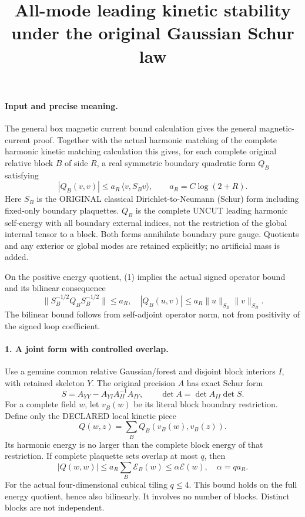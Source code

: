\documentclass[11pt]{article}
\title{All-mode leading kinetic stability under the original Gaussian Schur law}\author{}\date{}
\begin{document}
\maketitle
\paragraph{Input and precise meaning.}
The general box magnetic current bound calculation gives the general magnetic-current proof. Together
with the actual harmonic matching of the complete harmonic kinetic matching calculation this gives, for each complete
original relative block $B$ of side $R$, a real symmetric boundary
quadratic form $Q_B$ satisfying
\[
 |Q_B(v,v)|\le a_R\,\langle v,S_Bv\rangle,
 \qquad a_R=C\log(2+R).                                      \tag{1}
\]
Here $S_B$ is the ORIGINAL classical Dirichlet-to-Neumann (Schur)
form including fixed-only boundary plaquettes. $Q_B$ is the complete
UNCUT leading harmonic self-energy with all boundary external indices,
not the restriction of the global internal tensor to a block.
Both forms annihilate boundary pure gauge. Quotients and any exterior
or global modes are retained explicitly; no artificial mass is added.

On the positive energy quotient, (1) implies the actual signed operator
bound and its bilinear consequence
\[
 \|S_B^{-1/2}Q_BS_B^{-1/2}\|\le a_R,
 \quad |Q_B(u,v)|\le a_R\|u\|_{S_B}\|v\|_{S_B}.               \tag{2}
\]
The bilinear bound follows from self-adjoint operator norm, not from
positivity of the signed loop coefficient.

\paragraph{1. A joint form with controlled overlap.}
Use a genuine common relative Gaussian/forest and disjoint block
interiors $I$, with retained skeleton $Y$. The original precision $A$
has exact Schur form
\[
 S=A_{YY}-A_{YI}A_{II}^{-1}A_{IY},\qquad
 \det A=\det A_{II}\det S.                                  \tag{3}
\]
For a complete field $w$, let $v_B(w)$ be its literal block boundary
restriction. Define only the DECLARED local kinetic piece
\[
 Q(w,z)=\sum_B Q_B(v_B(w),v_B(z)).                             \tag{4}
\]
Its harmonic energy is no larger than the complete block energy of
that restriction. If complete plaquette sets overlap at most $q$, then
\[
 |Q(w,w)|\le a_R\sum_B\mathcal E_B(w)
                  \le \alpha\mathcal E(w),\quad \alpha=qa_R. \tag{5}
\]
For the actual four-dimensional cubical tiling $q\le4$.
This bound holds on the full energy quotient, hence also bilinearly.
It involves no number of blocks. Distinct blocks are not independent.
\end{document}
